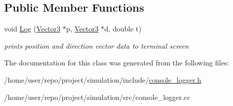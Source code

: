 \subsection*{Public Member Functions}
\begin{DoxyCompactItemize}
\item 
\mbox{\label{classConsoleLogger_a6f3940bf33ee1e4dc814529624ed7241}} 
void \hyperlink{classConsoleLogger_a6f3940bf33ee1e4dc814529624ed7241}{Log} (\hyperlink{classVector3}{Vector3} $\ast$p, \hyperlink{classVector3}{Vector3} $\ast$d, double t)
\begin{DoxyCompactList}\small\item\em prints position and direction vector data to terminal screen \end{DoxyCompactList}\end{DoxyCompactItemize}


The documentation for this class was generated from the following files\+:\begin{DoxyCompactItemize}
\item 
/home/user/repo/project/simulation/include/\hyperlink{console__logger_8h}{console\+\_\+logger.\+h}\item 
/home/user/repo/project/simulation/src/console\+\_\+logger.\+cc\end{DoxyCompactItemize}
